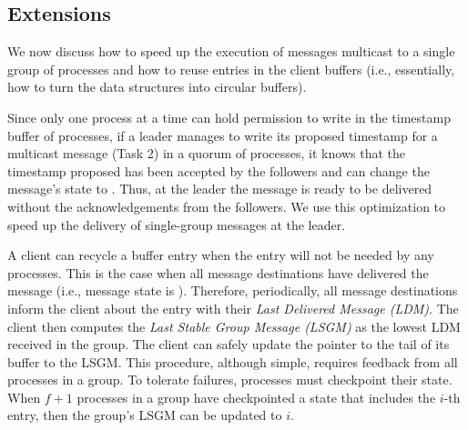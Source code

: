 






\subsection{Extensions}
\label{sec:extensions}

We now discuss how to speed up the execution of messages multicast to a single group of processes and how to reuse entries in the client buffers (i.e., essentially, how to turn the data structures into circular buffers).

Since only one process at a time can hold permission to write in the timestamp buffer of processes, if a leader manages to write its proposed timestamp for a multicast message (Task 2) in a quorum of processes, it knows that the timestamp proposed has been accepted by the followers and can change the message's state to \ordered.
Thus, at the leader the message is ready to be delivered without the acknowledgements from the followers.
We use this optimization to speed up the delivery of single-group messages at the leader.

A client can recycle a buffer entry when the entry will not be needed by any processes.
This is the case when all message destinations have delivered the message (i.e., message state is \done).
Therefore, periodically, all message destinations inform the client about the entry with their \emph{Last Delivered Message (LDM)}.
The client then computes the \emph{Last Stable Group Message (LSGM)} as the lowest LDM received in the group.
The client can safely update the pointer to the tail of its buffer to the LSGM.
This procedure, although simple, requires feedback from all processes in a group.
To tolerate failures, processes must checkpoint their state.
When $f+1$ processes in a group have checkpointed a state that includes the $i$-th entry, then the group's LSGM can be updated to $i$.






